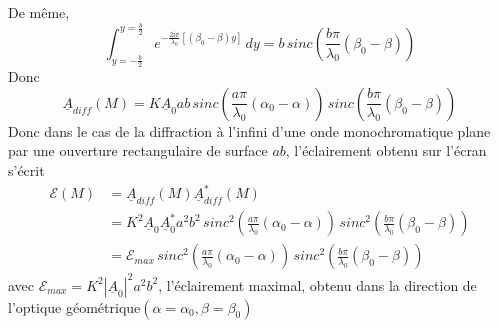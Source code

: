 \documentclass[a4paper,12pt]{book}
\begin{document}
De même,
$$
\int^{y=\frac{b}{2}}_{y=-\frac{b}{2}}e^{-\frac{2i\pi}{\lambda_0}[(\beta_0-\beta)y]}\,dy=b\,sinc(\frac{b\pi}{\lambda_0}(\beta_0-\beta))
$$
Donc 
$$
\boxed{\underline{A}_{diff}(M)=K\underline{A}_0ab\,sinc(\frac{a\pi}{\lambda_0}(\alpha_0-\alpha))\,sinc(\frac{b\pi}{\lambda_0}(\beta_0-\beta))}
$$
Donc dans le cas de la diffraction à l'infini d'une onde monochromatique plane par une ouverture rectangulaire de
surface $ab$, l'éclairement obtenu sur l'écran s'écrit
\begin{align*}
\mathcal{E}(M)&=\underline{A}_{diff}(M)\underline{A}^{*}_{diff}(M)\\
&=K^2\underline{A}_0\underline{A}_0^{*}a^2b^2\,sinc^2(\frac{a\pi}{\lambda_0}(\alpha_0-\alpha))\,sinc^2(\frac{b\pi}{\lambda_0}(\beta_0-\beta))\\
&=\boxed{\mathcal{E}_{max}\,sinc^2(\frac{a\pi}{\lambda_0}(\alpha_0-\alpha))\,sinc^2(\frac{b\pi}{\lambda_0}(\beta_0-\beta))}
\end{align*}
avec $\mathcal{E}_{max}=K^2|\underline{A}_0|^2a^2b^2$, l'éclairement maximal, obtenu dans la direction de l'optique géométrique$(\alpha=\alpha_0,\beta=\beta_0)$
\end{document}
